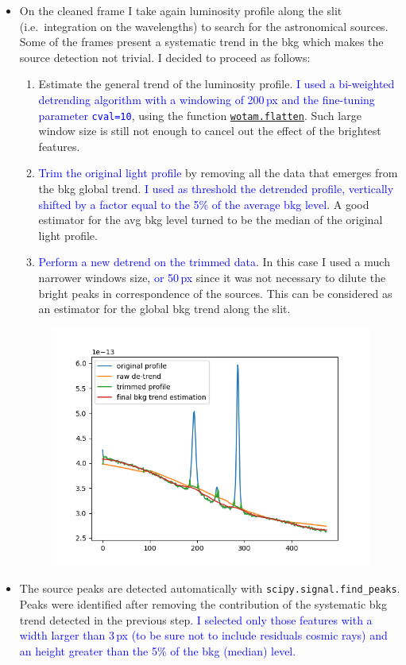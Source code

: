 \documentclass{article}
\newcommand{\arbitrario}[1]{\textcolor{blue}{#1}}
\begin{document}
\begin{itemize}
	\item On the cleaned frame I take again luminosity profile along the slit (i.e.\ integration on the wavelengths) to search for the astronomical sources.
	Some of the frames present a systematic trend in the bkg which makes the source detection not trivial. I decided to proceed as follows:
	\begin{enumerate}
		\item Estimate the general trend of the luminosity profile. \arbitrario{I used a bi-weighted detrending algorithm with a windowing of 200\,px and the fine-tuning parameter \texttt{cval=10}}, using the function \href{https://github.com/hippke/wotan}{\texttt{wotam.flatten}}. Such large window size is still not enough to cancel out the effect of the brightest features.
		\item \arbitrario{Trim the original light profile} by removing all the data that emerges from the bkg global trend. \arbitrario{I used as threshold the detrended profile, vertically shifted by a factor equal to the 5\% of the average bkg level}. A good estimator for the avg bkg level turned to be the median of the original light profile.
		\item \arbitrario{Perform a new detrend on the trimmed data}. In this case I used a much narrower windows size, \arbitrario{or 50\,px} since it was not necessary to dilute the bright peaks in correspondence of the sources. This can be considered as an estimator for the global bkg trend along the slit.
	\end{enumerate}
	\begin{figure}[h!]
		\centering
		\includegraphics[width=.65\textwidth]{detrend_example}
	\end{figure}
	\item The source peaks are detected automatically with \texttt{scipy.signal.find\_peaks}. Peaks were identified after removing the contribution of the systematic bkg trend detected in the previous step. \arbitrario{I selected only those features with a width larger than 3\,px (to be sure not to include residuals cosmic rays) and an height greater than the 5\% of the bkg (median) level.}
	

\end{itemize}
\end{document}
